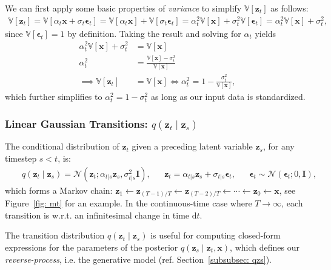 We can first apply some basic properties of \textit{variance} to simplify $\mathbb{V}[\mathbf{z}_t]$ as follows:
%
\begin{align}
    \mathbb{V}[\mathbf{z}_t] = \mathbb{V}[\alpha_{t} \mathbf{x} + \sigma_{t}\boldsymbol{\epsilon}_t] = \mathbb{V}[\alpha_{t} \mathbf{x}] + \mathbb{V}[\sigma_{t}\boldsymbol{\epsilon}_t] = \alpha_{t}^2\mathbb{V}[\mathbf{x}] + \sigma_{t}^2\mathbb{V}[\boldsymbol{\epsilon}_t] = \alpha_{t}^2\mathbb{V}[\mathbf{x}] + \sigma_{t}^2,
\end{align}
%
since $\mathbb{V}[\boldsymbol{\epsilon}_t] = 1$ by definition. Taking the result and solving for $\alpha_t$ yields
%
\begin{align}
    \alpha_{t}^2\mathbb{V}[\mathbf{x}] + \sigma_{t}^2 & = \mathbb{V}[\mathbf{x}] 
    \\[2pt] \alpha_{t}^2 & = \frac{\mathbb{V}[\mathbf{x}] - \sigma_{t}^2}{\mathbb{V}[\mathbf{x}]}
    \\[2pt] \implies \mathbb{V}[\mathbf{z}_t] & = \mathbb{V}[\mathbf{x}] \iff \alpha_{t}^2 = 1 - \frac{\sigma_{t}^2}{\mathbb{V}[\mathbf{x}]},
\end{align}
%
which further simplifies to $\alpha_t^2 = 1 - \sigma_t^2$ as long as our input data is standardized.
%
\newpage
\subsubsection{Linear Gaussian Transitions: $q(\mathbf{z}_t \mid \mathbf{z}_{s})$}
\label{subsubsec: lgt}
The conditional distribution of $\mathbf{z}_t$ given a preceding latent variable $\mathbf{z}_s$, for any timestep $s < t$, is:
%
\begin{align}
    &&q(\mathbf{z}_t \mid \mathbf{z}_{s}) = \mathcal{N}\left(\mathbf{z}_t;\alpha_{t|s}\mathbf{z}_s, \sigma_{t|s}^2 \mathbf{I} \right), && \mathbf{z}_t = \alpha_{t|s} \mathbf{z}_s + \sigma_{t|s}\boldsymbol{\epsilon}_t, && \boldsymbol{\epsilon}_t \sim \mathcal{N}\left(\boldsymbol{\epsilon}_t; 0, \mathbf{I}\right),&&
\end{align}
%
which forms a Markov chain: $\mathbf{z}_1 \leftarrow \mathbf{z}_{(T-1)/T} \leftarrow \mathbf{z}_{(T-2)/T} \leftarrow \cdots \leftarrow \mathbf{z}_0 \leftarrow \mathbf{x}$, see Figure~\ref{fig: mt} for an example. In the continuous-time case where $T \to \infty$, each transition is w.r.t. an infinitesimal change in time $\mathrm{d}t$.

The transition distribution $q(\mathbf{z}_t \mid \mathbf{z}_{s})$ is useful for computing closed-form expressions for the parameters of the posterior $q(\mathbf{z}_s \mid \mathbf{z}_t, \mathbf{x})$, which defines our \textit{reverse-process}, i.e. the generative model (ref. Section~\ref{subsubsec: qzs}).

